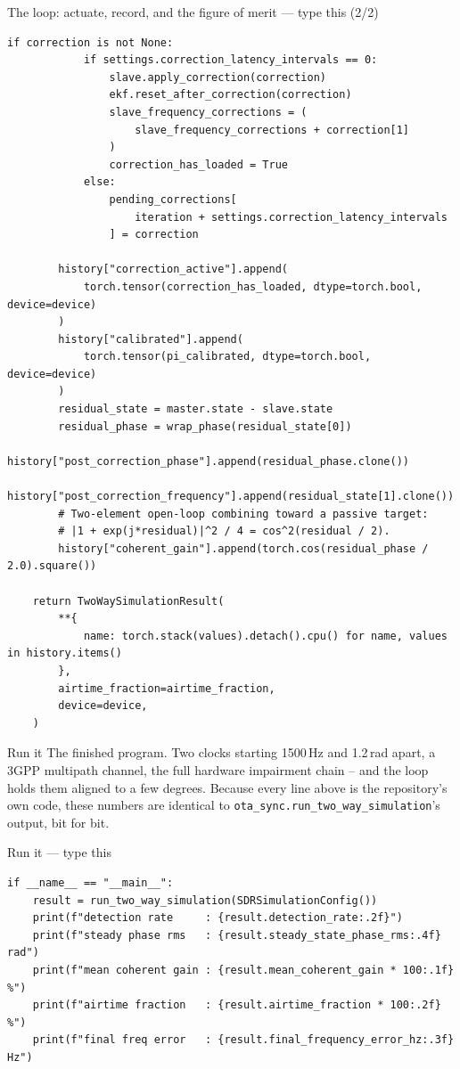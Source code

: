 \documentclass[10pt]{beamer}
\begin{document}
\begin{frame}[fragile]{The loop: actuate, record, and the figure of merit --- type this (2/2)}
\begin{lstlisting}[basicstyle=\ttfamily\tiny]
        if correction is not None:
            if settings.correction_latency_intervals == 0:
                slave.apply_correction(correction)
                ekf.reset_after_correction(correction)
                slave_frequency_corrections = (
                    slave_frequency_corrections + correction[1]
                )
                correction_has_loaded = True
            else:
                pending_corrections[
                    iteration + settings.correction_latency_intervals
                ] = correction

        history["correction_active"].append(
            torch.tensor(correction_has_loaded, dtype=torch.bool, device=device)
        )
        history["calibrated"].append(
            torch.tensor(pi_calibrated, dtype=torch.bool, device=device)
        )
        residual_state = master.state - slave.state 
        residual_phase = wrap_phase(residual_state[0])
        history["post_correction_phase"].append(residual_phase.clone())
        history["post_correction_frequency"].append(residual_state[1].clone())
        # Two-element open-loop combining toward a passive target:
        # |1 + exp(j*residual)|^2 / 4 = cos^2(residual / 2).
        history["coherent_gain"].append(torch.cos(residual_phase / 2.0).square())

    return TwoWaySimulationResult(
        **{
            name: torch.stack(values).detach().cpu() for name, values in history.items()
        },
        airtime_fraction=airtime_fraction,
        device=device,
    )
\end{lstlisting}
\end{frame}

\begin{frame}{Run it}
  The finished program. Two clocks starting 1500\,Hz and
  1.2\,rad apart, a 3GPP multipath channel, the full
  hardware impairment chain -- and the loop holds them
  aligned to a few degrees. Because every line above is the
  repository's own code, these numbers are identical to
  \texttt{ota\_sync.run\_two\_way\_simulation}'s output,
  bit for bit.
\end{frame}

\begin{frame}[fragile]{Run it --- type this}
\begin{lstlisting}[basicstyle=\ttfamily\tiny]
if __name__ == "__main__":
    result = run_two_way_simulation(SDRSimulationConfig())
    print(f"detection rate     : {result.detection_rate:.2f}")
    print(f"steady phase rms   : {result.steady_state_phase_rms:.4f} rad")
    print(f"mean coherent gain : {result.mean_coherent_gain * 100:.1f} %")
    print(f"airtime fraction   : {result.airtime_fraction * 100:.2f} %")
    print(f"final freq error   : {result.final_frequency_error_hz:.3f} Hz")
\end{lstlisting}
\end{frame}
\end{document}
